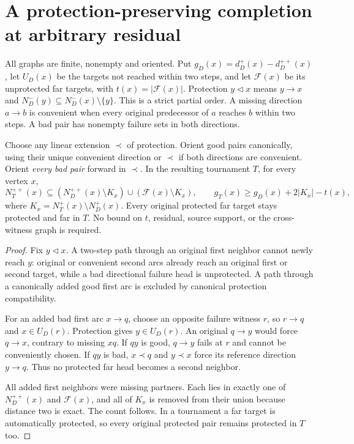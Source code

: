 \section{A protection-preserving completion at arbitrary residual}
\label{sec:global-reference-completion}

All graphs are finite, nonempty and oriented. Put
$g_D(x)=d_D^+(x)-d_D^{++}(x)$, let $U_D(x)$ be the targets not reached
within two steps, and let $\mathcal F(x)$ be its unprotected far targets,
with $t(x)=|\mathcal F(x)|$. Protection $y\triangleleft x$ means
$y\to x$ and $N_D^-(y)\subseteq N_D^-(x)\setminus\{y\}$.
This is a strict partial order. A missing direction $a\to b$ is
convenient when every original predecessor of $a$ reaches $b$ within
two steps. A bad pair has nonempty failure sets in both directions.

\begin{lemma}
\label{lem:global-priority-envelope}
Choose any linear extension $\prec$ of protection. Orient good pairs
canonically, using their unique convenient direction or $\prec$ if
both directions are convenient. Orient \emph{every bad pair} forward
in $\prec$. In the resulting tournament $T$, for every vertex $x$,
\[
 N_T^{++}(x)\subseteq
 (N_D^{++}(x)\setminus K_x)\cup
 (\mathcal F(x)\setminus K_x),\qquad
 g_T(x)\ge g_D(x)+2|K_x|-t(x),
\]
where $K_x=N_T^+(x)\setminus N_D^+(x)$. Every original protected far
target stays protected and far in $T$. No bound on $t$, residual,
source support, or the cross-witness graph is required.
\end{lemma}
\begin{proof}
Fix $y\triangleleft x$. A two-step path through an original first
neighbor cannot newly reach $y$: original or convenient second arcs
already reach an original first or second target, while a bad directional
failure head is unprotected. A path through a canonically added good
first arc is excluded by canonical protection compatibility.

For an added bad first arc $x\to q$, choose an opposite failure
witness $r$, so $r\to q$ and $x\in U_D(r)$. Protection gives
$y\in U_D(r)$. An original $q\to y$ would force $q\to x$, contrary
to missing $xq$. If $qy$ is good, $q\to y$ fails at $r$ and cannot
be conveniently chosen. If $qy$ is bad, $x\prec q$ and
$y\prec x$ force its reference direction $y\to q$. Thus no protected
far head becomes a second neighbor.

All added first neighbors were missing partners. Each lies in exactly
one of $N_D^{++}(x)$ and $\mathcal F(x)$, and all of $K_x$ is removed
from their union because distance two is exact. The count follows.
In a tournament a far target is automatically protected, so every
original protected pair remains protected in $T$ too.
\end{proof}

